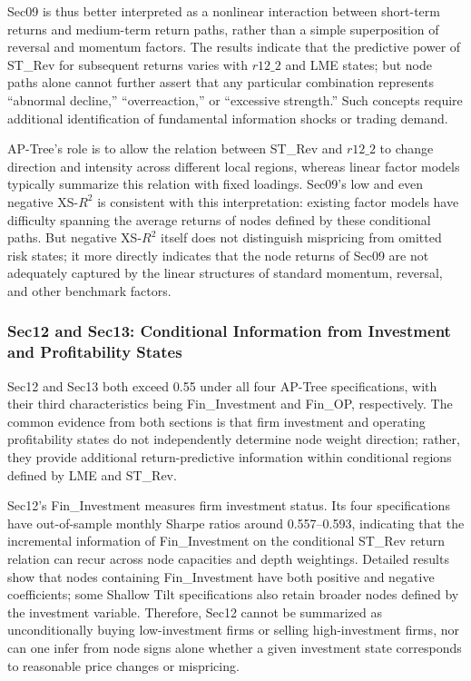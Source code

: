\documentclass[12pt]{article}
\begin{document}
Sec09 is thus better interpreted as a nonlinear interaction between short-term returns and medium-term return paths, rather than a simple superposition of reversal and momentum factors. The results indicate that the predictive power of ST\_Rev for subsequent returns varies with \(r12\_2\) and LME states; but node paths alone cannot further assert that any particular combination represents ``abnormal decline,'' ``overreaction,'' or ``excessive strength.'' Such concepts require additional identification of fundamental information shocks or trading demand.

AP-Tree's role is to allow the relation between ST\_Rev and \(r12\_2\) to change direction and intensity across different local regions, whereas linear factor models typically summarize this relation with fixed loadings. Sec09's low and even negative XS-\(R^2\) is consistent with this interpretation: existing factor models have difficulty spanning the average returns of nodes defined by these conditional paths. But negative XS-\(R^2\) itself does not distinguish mispricing from omitted risk states; it more directly indicates that the node returns of Sec09 are not adequately captured by the linear structures of standard momentum, reversal, and other benchmark factors.

\subsubsection{Sec12 and Sec13: Conditional Information from Investment and Profitability States}

Sec12 and Sec13 both exceed 0.55 under all four AP-Tree specifications, with their third characteristics being Fin\_Investment and Fin\_OP, respectively. The common evidence from both sections is that firm investment and operating profitability states do not independently determine node weight direction; rather, they provide additional return-predictive information within conditional regions defined by LME and ST\_Rev.

Sec12's Fin\_Investment measures firm investment status. Its four specifications have out-of-sample monthly Sharpe ratios around 0.557–0.593, indicating that the incremental information of Fin\_Investment on the conditional ST\_Rev return relation can recur across node capacities and depth weightings. Detailed results show that nodes containing Fin\_Investment have both positive and negative coefficients; some Shallow Tilt specifications also retain broader nodes defined by the investment variable. Therefore, Sec12 cannot be summarized as unconditionally buying low-investment firms or selling high-investment firms, nor can one infer from node signs alone whether a given investment state corresponds to reasonable price changes or mispricing.
\end{document}
